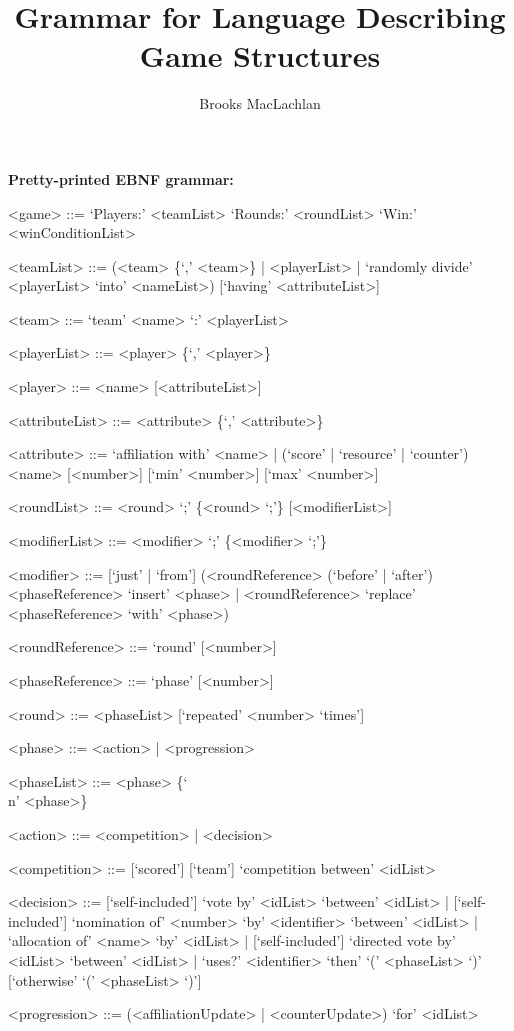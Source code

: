 \documentclass{article}
\title{Grammar for Language Describing Game Structures}
\author{Brooks MacLachlan}
\begin{document}
\maketitle

\noindent \textbf{Pretty-printed EBNF grammar:}
\begin{grammar}
<game> ::= `Players:' <teamList> `Rounds:' <roundList> `Win:' 
<winConditionList>

<teamList> ::= (<team> \{`,' <team>\} | <playerList> | `randomly divide' 
<playerList> `into' <nameList>) [`having' <attributeList>]

<team> ::= `team' <name> `:' <playerList>

<playerList> ::= <player> \{`,' <player>\}

<player> ::= <name> [<attributeList>]

<attributeList> ::= <attribute> \{`,' <attribute>\}

<attribute> ::= `affiliation with' <name> | (`score' | `resource' | `counter') 
<name> [<number>] [`min' <number>] [`max' <number>]

<roundList> ::= <round> `;' \{<round> `;'\} [<modifierList>]

<modifierList> ::= <modifier> `;' \{<modifier> `;'\}

<modifier> ::= [`just' | `from'] (<roundReference> (`before' | `after') 
<phaseReference> `insert' <phase> | <roundReference> `replace' <phaseReference> 
`with' <phase>)

<roundReference> ::= `round' [<number>]

<phaseReference> ::= `phase' [<number>]

<round> ::= <phaseList> [`repeated' <number> `times']

<phase> ::= <action> | <progression>

<phaseList> ::= <phase> \{`\\n' <phase>\}

<action> ::= <competition> | <decision>

<competition> ::= [`scored'] [`team'] `competition between' <idList>

<decision> ::= [`self-included'] `vote by' <idList> `between' <idList> | 
[`self-included'] `nomination of' <number> `by' <identifier> `between' <idList> 
| `allocation of' <name> `by' <idList> | [`self-included'] `directed vote by' 
<idList> `between' 
<idList> | `uses?' <identifier> `then' `(' <phaseList> `)' [`otherwise' `(' 
<phaseList> `)']

<progression> ::= (<affiliationUpdate> | <counterUpdate>) `for' <idList>


\end{grammar}
\end{document}
